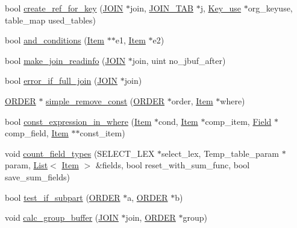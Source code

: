 \begin{DoxyCompactItemize}
bool \mbox{\hyperlink{group__Query__Optimizer_ga3b518fb7975676afc7395b412e803368}{create\+\_\+ref\+\_\+for\+\_\+key}} (\mbox{\hyperlink{classJOIN}{J\+O\+IN}} $\ast$join, \mbox{\hyperlink{classJOIN__TAB}{J\+O\+I\+N\+\_\+\+T\+AB}} $\ast$j, \mbox{\hyperlink{classKey__use}{Key\+\_\+use}} $\ast$org\+\_\+keyuse, table\+\_\+map used\+\_\+tables)
\item 
bool \mbox{\hyperlink{group__Query__Optimizer_gad3c0a5624f789fb0bf0c5fc5ec057de9}{and\+\_\+conditions}} (\mbox{\hyperlink{classItem}{Item}} $\ast$$\ast$e1, \mbox{\hyperlink{classItem}{Item}} $\ast$e2)
\item 
bool \mbox{\hyperlink{group__Query__Optimizer_ga27b74179b9a9207753aa3f93a9df4225}{make\+\_\+join\+\_\+readinfo}} (\mbox{\hyperlink{classJOIN}{J\+O\+IN}} $\ast$join, uint no\+\_\+jbuf\+\_\+after)
\item 
bool \mbox{\hyperlink{group__Query__Optimizer_gaf1351457ee30a4e67786117e50413541}{error\+\_\+if\+\_\+full\+\_\+join}} (\mbox{\hyperlink{classJOIN}{J\+O\+IN}} $\ast$join)
\item 
\mbox{\hyperlink{structst__order}{O\+R\+D\+ER}} $\ast$ \mbox{\hyperlink{group__Query__Optimizer_gadbc980a72c17c8442fab87af085697d4}{simple\+\_\+remove\+\_\+const}} (\mbox{\hyperlink{structst__order}{O\+R\+D\+ER}} $\ast$order, \mbox{\hyperlink{classItem}{Item}} $\ast$where)
\item 
bool \mbox{\hyperlink{group__Query__Optimizer_ga8478e8df214dcc332c84d24ebe3f0785}{const\+\_\+expression\+\_\+in\+\_\+where}} (\mbox{\hyperlink{classItem}{Item}} $\ast$cond, \mbox{\hyperlink{classItem}{Item}} $\ast$comp\+\_\+item, \mbox{\hyperlink{classField}{Field}} $\ast$comp\+\_\+field, \mbox{\hyperlink{classItem}{Item}} $\ast$$\ast$const\+\_\+item)
\item 
void \mbox{\hyperlink{group__Query__Optimizer_ga37c57743c17000bba9bbbbd87b01d32f}{count\+\_\+field\+\_\+types}} (S\+E\+L\+E\+C\+T\+\_\+\+L\+EX $\ast$select\+\_\+lex, Temp\+\_\+table\+\_\+param $\ast$param, \mbox{\hyperlink{classList}{List}}$<$ \mbox{\hyperlink{classItem}{Item}} $>$ \&fields, bool reset\+\_\+with\+\_\+sum\+\_\+func, bool save\+\_\+sum\+\_\+fields)
\item 
bool \mbox{\hyperlink{group__Query__Optimizer_ga4d5a2e1822e2131fcfbe6501a8a97525}{test\+\_\+if\+\_\+subpart}} (\mbox{\hyperlink{structst__order}{O\+R\+D\+ER}} $\ast$a, \mbox{\hyperlink{structst__order}{O\+R\+D\+ER}} $\ast$b)
\item 
void \mbox{\hyperlink{group__Query__Optimizer_gaa978828bfe7be091fb76e1c5da80d644}{calc\+\_\+group\+\_\+buffer}} (\mbox{\hyperlink{classJOIN}{J\+O\+IN}} $\ast$join, \mbox{\hyperlink{structst__order}{O\+R\+D\+ER}} $\ast$group)

\end{DoxyCompactItemize}
